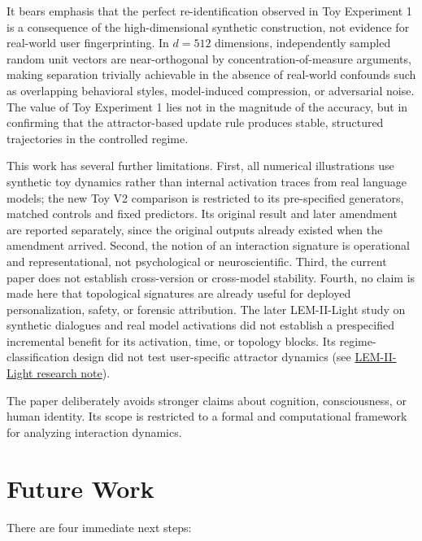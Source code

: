 \documentclass[11pt]{article}
\begin{document}
It bears emphasis that the perfect re-identification observed in Toy Experiment 1 is
a consequence of the high-dimensional synthetic construction, not evidence for
real-world user fingerprinting. In $d=512$ dimensions, independently sampled random
unit vectors are near-orthogonal by concentration-of-measure arguments, making
separation trivially achievable in the absence of real-world confounds such as
overlapping behavioral styles, model-induced compression, or adversarial noise. The
value of Toy Experiment 1 lies not in the magnitude of the accuracy, but in confirming
that the attractor-based update rule produces stable, structured trajectories in the
controlled regime.

This work has several further limitations. First, all numerical illustrations use
synthetic toy dynamics rather than internal activation traces from real language
models; the new Toy V2 comparison is restricted to its pre-specified generators,
matched controls and fixed predictors. Its original result and later amendment
are reported separately, since the original outputs already existed when the
amendment arrived. Second, the notion of an interaction signature is operational and
representational, not psychological or neuroscientific. Third, the current paper does
not establish cross-version or cross-model stability. Fourth, no claim is made here
that topological signatures are already useful for deployed personalization, safety,
or forensic attribution. The later LEM-II-Light study on synthetic dialogues and
real model activations did not establish a prespecified incremental benefit for
its activation, time, or topology blocks. Its regime-classification design did
not test user-specific attractor dynamics (see
\href{https://github.com/LAKITALKS/LEM/blob/main/research/LEM_II_LIGHT_RESEARCH_NOTE.md}{LEM-II-Light research note}).

The paper deliberately avoids stronger claims about cognition, consciousness, or human
identity. Its scope is restricted to a formal and computational framework for
analyzing interaction dynamics.


\section{Future Work}

There are four immediate next steps:
\end{document}
